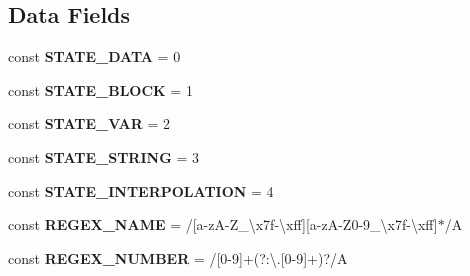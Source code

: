 \subsection*{Data Fields}
\begin{DoxyCompactItemize}
\item 
\hypertarget{class_twig___lexer_aed1034ab76d6f68a9936141fb43e46c4}{}const {\bfseries S\+T\+A\+T\+E\+\_\+\+D\+A\+T\+A} = 0\label{class_twig___lexer_aed1034ab76d6f68a9936141fb43e46c4}

\item 
\hypertarget{class_twig___lexer_a7943cc4ef427db839acf8405ab7622b1}{}const {\bfseries S\+T\+A\+T\+E\+\_\+\+B\+L\+O\+C\+K} = 1\label{class_twig___lexer_a7943cc4ef427db839acf8405ab7622b1}

\item 
\hypertarget{class_twig___lexer_ace602c247a72e20792de0cbbaece8d4e}{}const {\bfseries S\+T\+A\+T\+E\+\_\+\+V\+A\+R} = 2\label{class_twig___lexer_ace602c247a72e20792de0cbbaece8d4e}

\item 
\hypertarget{class_twig___lexer_aee10c9511fcc8204cd8ba7ced221e096}{}const {\bfseries S\+T\+A\+T\+E\+\_\+\+S\+T\+R\+I\+N\+G} = 3\label{class_twig___lexer_aee10c9511fcc8204cd8ba7ced221e096}

\item 
\hypertarget{class_twig___lexer_ab366646ed1df9dc0a6b90e96dbaa2293}{}const {\bfseries S\+T\+A\+T\+E\+\_\+\+I\+N\+T\+E\+R\+P\+O\+L\+A\+T\+I\+O\+N} = 4\label{class_twig___lexer_ab366646ed1df9dc0a6b90e96dbaa2293}

\item 
\hypertarget{class_twig___lexer_a16ad69f49b3f1e3d15823ce6760c49c1}{}const {\bfseries R\+E\+G\+E\+X\+\_\+\+N\+A\+M\+E} = \textquotesingle{}/\mbox{[}a-\/z\+A-\/Z\+\_\+\textbackslash{}x7f-\/\textbackslash{}xff\mbox{]}\mbox{[}a-\/z\+A-\/Z0-\/9\+\_\+\textbackslash{}x7f-\/\textbackslash{}xff\mbox{]}$\ast$/\+A\textquotesingle{}\label{class_twig___lexer_a16ad69f49b3f1e3d15823ce6760c49c1}

\item 
\hypertarget{class_twig___lexer_aba3337b652ecdf16df6874ebc9307462}{}const {\bfseries R\+E\+G\+E\+X\+\_\+\+N\+U\+M\+B\+E\+R} = \textquotesingle{}/\mbox{[}0-\/9\mbox{]}+(?\+:\textbackslash{}.\mbox{[}0-\/9\mbox{]}+)?/A\textquotesingle{}\label{class_twig___lexer_aba3337b652ecdf16df6874ebc9307462}


\end{DoxyCompactItemize}
